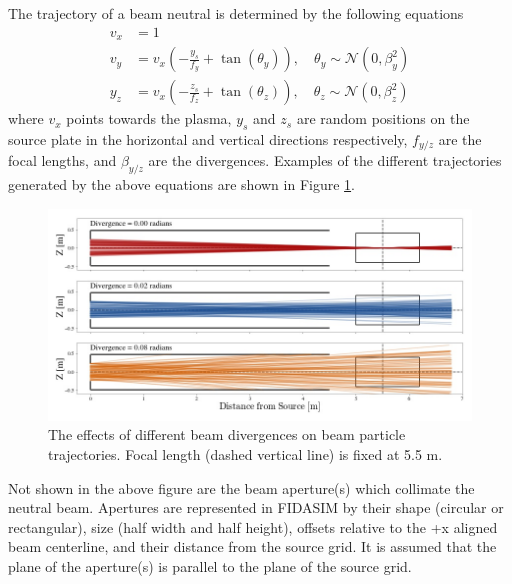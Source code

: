 The trajectory of a beam neutral is determined by the following equations
\begin{equation}\label{eq:beam_trajectory}
    \begin{split}
        v_x &= 1  \\
        v_y &= v_x\left(-\frac{y_s}{f_y} + \tan(\theta_y)\right),\quad \theta_y \sim \mathcal{N}(0,\beta_y^2) \\
        y_z &= v_x\left(-\frac{z_s}{f_z} + \tan(\theta_z)\right),\quad \theta_z \sim \mathcal{N}(0,\beta_z^2)
    \end{split}
\end{equation}
where $v_x$ points towards the plasma, $y_s$ and $z_s$ are random positions on the source plate in the horizontal and vertical directions respectively, $f_{y/z}$ are the focal lengths, and $\beta_{y/z}$ are the divergences. Examples of the different trajectories generated by the above equations are shown in Figure \ref{fig:beam_divergence}.
\begin{figure}[ht]
    \centering
    \includegraphics[width=15cm]{figures/beam_divergence.jpg}
    \caption{The effects of different beam divergences on beam particle trajectories. Focal length (dashed vertical line) is fixed at 5.5 m.}
    \label{fig:beam_divergence}
\end{figure}
Not shown in the above figure are the beam aperture(s) which collimate the neutral beam. Apertures are represented in FIDASIM by their shape (circular or rectangular), size (half width and half height), offsets relative to the +x aligned beam centerline, and their distance from the source grid. It is assumed that the plane of the aperture(s) is parallel to the plane of the source grid.

